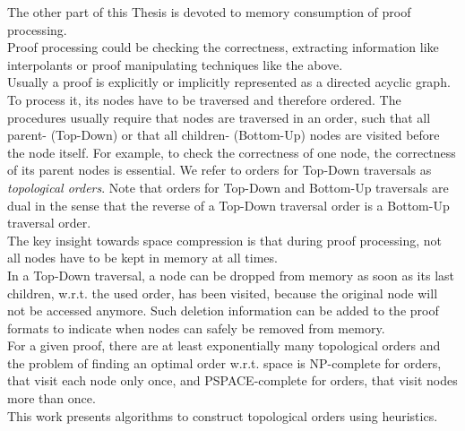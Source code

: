 The other part of this Thesis is devoted to memory consumption of proof processing.\\
Proof processing could be checking the correctness, extracting information like interpolants or proof manipulating techniques like the above.\\
Usually a proof is explicitly or implicitly represented as a directed acyclic graph.
To process it, its nodes have to be traversed and therefore ordered.
The procedures usually require that nodes are traversed in an order, such that all parent- (Top-Down) or that all children- (Bottom-Up) nodes are visited before the node itself.
For example, to check the correctness of one node, the correctness of its parent nodes is essential. 
We refer to orders for Top-Down traversals as \emph{topological orders}. Note that orders for Top-Down and Bottom-Up traversals are dual in the sense that the reverse of a Top-Down traversal order is a Bottom-Up traversal order.\\
The key insight towards space compression is that during proof processing, not all nodes have to be kept in memory at all times.\\
In a Top-Down traversal, a node can be dropped from memory as soon as its last children, w.r.t. the used order, has been visited, because the original node will not be accessed anymore.
Such deletion information can be added to the proof formats to indicate when nodes can safely be removed from memory.\\
For a given proof, there are at least exponentially many topological orders and the problem of finding an optimal order w.r.t. space is NP-complete \cite{Sethi1975} for orders, that visit each node only once, and PSPACE-complete \cite{Gilbert1980} for orders, that visit nodes more than once.\\
This work presents algorithms to construct topological orders using heuristics.


